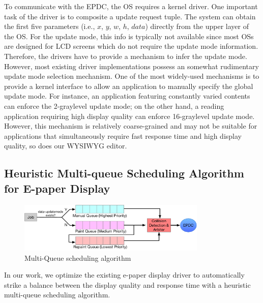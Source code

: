 \documentclass[]{sigchi}
\begin{document}
To communicate with the EPDC, the OS requires a kernel driver. 
One important task of the driver is to composite a update request tuple.
The system can obtain the first five parameters (i.e., $x$, $y$, $w$, $h$, $data$) directly from the upper layer of the OS.
For the update mode, this info is typically not available since most OSs are designed for LCD screens which do not require the update mode information.
Therefore, the drivers have to provide a mechanism to infer the update mode.
However, most existing driver implementations possess an somewhat rudimentary update mode selection mechanism.
One of the most widely-used mechanisms is to provide a kernel interface to allow an application to manually specify the global update mode.
For instance, an application featuring constantly varied contents can enforce the 2-graylevel update mode; on the other hand, a reading application requiring high display quality can enforce 16-graylevel update mode.
However, this mechanism is relatively coarse-grained and may not be suitable for applications that simultaneously require fast response time and high display quality, so does our WYSIWYG editor.





 

\subsection{Heuristic Multi-queue Scheduling Algorithm for E-paper Display}

\begin{figure}[t]
\begin{center}
\includegraphics[width=0.8\textwidth]{figures/heruist}
\caption{Multi-Queue scheduling algorithm}
\label{fig:Heruist}
\end{center}
\end{figure}
In our work, we optimize the existing e-paper display driver to automatically strike a balance between the display quality and response time with a heuristic multi-queue scheduling algorithm.
\end{document}
